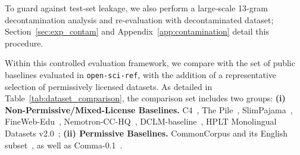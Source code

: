 To guard against test‑set leakage, we also perform a large‑scale 13‑gram decontamination analysis and re‑evaluation with decontaminated dataset; Section~\ref{sec:exp_contam} and Appendix~\ref{app:contamination} detail this procedure.



Within this controlled evaluation framework, we compare \MixtureVitae{} with the set of public baselines evaluated in \texttt{open-sci-ref}, with the addition of a representative selection of permissively licensed datasets. As detailed in Table~\ref{tab:dataset_comparison}, the comparison set includes two groups: \textbf{(i) Non-Permissive/Mixed-License Baselines.} C4~\citep{raffel2020exploring}, The Pile~\citep{gao2020pile}, SlimPajama~\citep{shen2024slimpajamadcunderstandingdatacombinations}, FineWeb-Edu~\citep{penedo2024}, Nemotron-CC-HQ~\citep{su2025nemotroncc}, DCLM-baseline~\citep{li2024datacomplm}, HPLT Monolingual Datasets v2.0~\citep{burchell2025}; \textbf{ (ii) Permissive Baselines.} CommonCorpus and its English subset~\citep{langlais2025commoncorpuslargestcollection}, as well as Comma-0.1~\citep{kandpal2025commonpilev018tb}.


